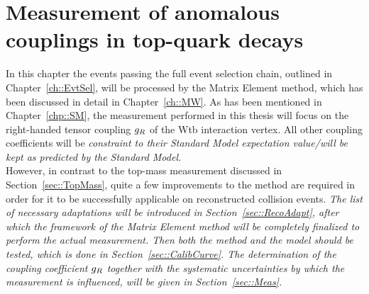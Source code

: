 \chapter{Measurement of anomalous couplings in top-quark decays} \label{ch::Analysis}

In this chapter the events passing the full event selection chain, outlined in Chapter~\ref{ch::EvtSel}, will be processed by the Matrix Element method, which has been discussed in detail in Chapter~\ref{ch::MW}. As has been mentioned in Chapter~\ref{chp::SM}, the measurement performed in this thesis will focus on the right-handed tensor coupling $g_{R}$ of the Wtb interaction vertex. All other coupling coefficients will be \textit{constraint to their Standard Model expectation value/will be kept as predicted by the Standard Model.}
\\

However, in contrast to the top-mass measurement discussed in Section~\ref{sec::TopMass}, quite a few improvements to the method are required in order for it to be successfully applicable on reconstructed collision events.
\textit{The list of necessary adaptations will be introduced in Section~\ref{sec::RecoAdapt}, after which the framework of the Matrix Element method will be completely finalized to perform the actual measurement.
Then both the method and the model should be tested, which is done in Section~\ref{sec::CalibCurve}.
The determination of the coupling coefficient $g_{R}$ together with the systematic uncertainties by which the measurement is influenced, will be given in Section~\ref{sec::Meas}.}


